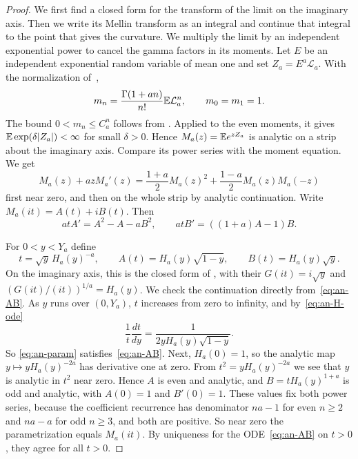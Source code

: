 \begin{proof}
We first find a closed form for the transform of the limit on the
imaginary axis. Then we write its Mellin transform as an integral and
continue that integral to the point that gives the curvature.
We multiply the limit by an independent exponential power to cancel
the gamma factors in its moments.
Let $E$ be an independent exponential random variable of mean one
and set $Z_a=E^a\mathcal L_a$. With the normalization of~\cite{glrs2025},
\[
 m_n=\frac{\Gamma(1+an)}{n!}\mathbb{E} \mathcal L_a^n,
 \qquad m_0=m_1=1.
\]
The bound $0<m_n\le C_a^n$ follows from
\cite[Lemma~2.10 and Corollary~2.14]{glr2026}. Applied to
the even moments, it gives $\mathbb{E}\exp(\delta|Z_a|)<\infty$ for small
$\delta>0$. Hence $M_a(z)=\mathbb{E} e^{zZ_a}$ is analytic on a strip
about the imaginary axis. Compare its power series with the moment
equation. We get
\begin{equation}\label{eq:an-moment-ode}
 M_a(z)+azM_a'(z)
 =\frac{1+a}{2}M_a(z)^2
  +\frac{1-a}{2}M_a(z)M_a(-z)
\end{equation}
first near zero, and then on the whole strip by analytic
continuation. Write $M_a(it)=A(t)+iB(t)$. Then
\begin{equation}\label{eq:an-AB}
 atA'=A^2-A-aB^2,\qquad
 atB'=((1+a)A-1)B.
\end{equation}

For $0<y<Y_a$ define
\begin{equation}\label{eq:an-param}
 t=\sqrt y\,H_a(y)^{-a},\qquad
 A(t)=H_a(y)\sqrt{1-y},\qquad B(t)=H_a(y)\sqrt y.
\end{equation}
On the imaginary axis, this is the closed form of
\cite[Proposition~3.2]{glrs2025}, with their $G(it)=i\sqrt y$
and $(G(it)/(it))^{1/a}=H_a(y)$. We check the continuation directly
from~\eqref{eq:an-AB}. As $y$ runs over $(0,Y_a)$, $t$ increases from
zero to infinity, and by~\eqref{eq:an-H-ode}
\[
 \frac{1}{t}\frac{dt}{dy}
 =\frac{1}{2yH_a(y)\sqrt{1-y}}.
\]
So \eqref{eq:an-param} satisfies~\eqref{eq:an-AB}.
Next, $H_a(0)=1$, so the analytic map $y\mapsto yH_a(y)^{-2a}$ has
derivative one at zero. From $t^2=yH_a(y)^{-2a}$ we see that $y$ is
analytic in $t^2$ near zero. Hence $A$ is even and analytic, and
$B=tH_a(y)^{1+a}$ is odd and analytic, with $A(0)=1$ and $B'(0)=1$.
These values fix both power series, because the coefficient
recurrence has denominator $na-1$ for even $n\ge2$ and $na-a$ for
odd $n\ge3$, and both are positive. So near zero the parametrization
equals $M_a(it)$. By uniqueness for the ODE~\eqref{eq:an-AB} on
$t>0$, they agree for all $t>0$.


\end{proof}
